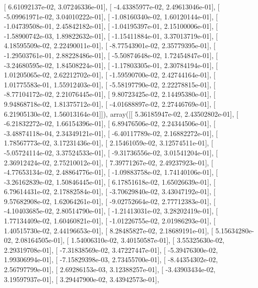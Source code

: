 \documentclass{article}
\begin{document}
       [  6.61092137e-02,   3.07246336e-01],
       [ -4.43385977e-02,   2.49613046e-01],
       [ -5.09961971e-02,   3.04010222e-01],
       [ -1.08160340e-02,   1.60120144e-01],
       [ -1.04739508e-01,   2.45842182e-01],
       [ -1.04195397e-01,   2.15100006e-01],
       [ -1.58900742e-03,   1.89822632e-01],
       [ -1.15411884e-01,   3.37013719e-01],
       [  4.18595509e-02,   2.22490011e-01],
       [ -8.77543901e-02,   2.35779395e-01],
       [ -1.29503761e-01,   2.88228486e-01],
       [ -5.50874648e-02,   1.72454847e-01],
       [ -3.24680595e-02,   1.84508224e-01],
       [ -1.17803305e-01,   2.30784194e-01],
       [  1.01205065e-02,   2.62212702e-01],
       [ -1.59590700e-02,   2.42744164e-01],
       [  1.01775583e-01,   1.55912403e-01],
       [ -5.58197790e-02,   2.22278815e-01],
       [ -8.77104172e-02,   2.21076445e-01],
       [  9.80723425e-02,   2.14495380e-01],
       [  9.94868718e-02,   1.81375712e-01],
       [ -4.01688897e-02,   2.27446769e-01],
       [  6.21905130e-02,   1.56013164e-01]]), array([[  5.36185947e-02,   2.43502802e-01],
       [ -6.21832272e-02,   1.66154396e-01],
       [  6.89476506e-02,   2.24344506e-01],
       [ -3.48874118e-04,   2.34349121e-01],
       [ -6.40117789e-02,   2.16882272e-01],
       [  1.78567773e-02,   3.17231436e-01],
       [  2.15461059e-02,   3.12574511e-01],
       [ -5.05724114e-02,   3.37524533e-01],
       [ -9.31736556e-02,   3.01541204e-01],
       [  2.36912424e-02,   2.75210012e-01],
       [  7.39771267e-02,   2.49237923e-01],
       [ -4.77653134e-02,   2.48864776e-01],
       [ -1.09883758e-02,   1.74140106e-01],
       [ -3.26162839e-02,   1.50846445e-01],
       [  6.17851618e-02,   1.65026639e-01],
       [  6.79614431e-02,   2.17882584e-01],
       [ -3.70629840e-02,   3.43047192e-01],
       [  9.57682908e-02,   1.62064261e-01],
       [ -9.02752664e-02,   2.77712383e-01],
       [ -4.10403685e-02,   2.80514790e-01],
       [ -1.21413031e-02,   3.28202419e-01],
       [  1.77134409e-02,   1.60460821e-01],
       [ -1.01226755e-02,   2.01986293e-01],
       [  1.40515730e-02,   2.44196653e-01],
       [  8.28485827e-02,   2.18689191e-01],
       [  5.15634280e-02,   2.08164505e-01],
       [  1.54006310e-02,   3.40150587e-01],
       [  3.55325630e-02,   2.29319708e-01],
       [ -7.31838569e-02,   3.47227447e-01],
       [ -5.39476300e-02,   1.99306994e-01],
       [ -7.15829398e-03,   2.73455700e-01],
       [ -8.44354302e-02,   2.56797799e-01],
       [  2.69286153e-03,   3.12388257e-01],
       [ -3.43903434e-02,   3.19597937e-01],
       [  3.29447900e-02,   3.43942573e-01],
\end{document}
